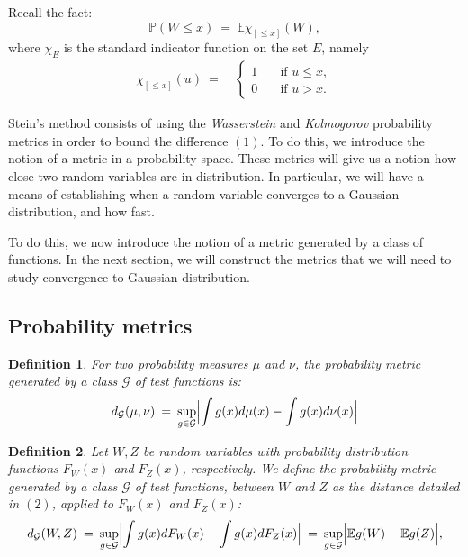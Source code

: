 \documentclass[12pt]{article}
\newcommand{\eq }{\: = \:}
\newtheorem{definition}{Definition}
\theoremstyle{nonumberplain}
\begin{document}
Recall the fact:
$$
\mathbb{P} (W\leq{x})\eq \mathbb{E}\chi_{[\le x]}(W),
$$
where $\chi_E$ is the standard indicator function on the set $E$, namely
\begin{align*}
\chi_{[\le x]}(u)\eq &\left\{
            \begin{array}{ll}
             1 \quad &\mbox{if } u\leq x,\\
             0 \quad &\mbox{if } u>x.   
            \end{array}
            \right.
\end{align*}

Stein's method consists of using the \textit{Wasserstein} and \textit{Kolmogorov} probability metrics in order to bound the difference $(1)$. To do this, we introduce the notion of a metric in a probability space. These metrics will give us a notion how close two random variables are in distribution. In particular, we will have a means of establishing when a random variable converges to a Gaussian distribution, and how fast.
 
To do this, we now introduce the notion of a metric generated by a class of functions. In the next section, we will construct the metrics that we will need to study convergence to Gaussian distribution.

\subsection{Probability metrics}

\begin{definition}
For two probability measures $\mu$ and $\nu$, the probability metric generated by a class $\mathcal{G}$ of test functions is:
\begin{equation}
d_{\mathcal{G}}(\mu, \nu)\eq \sup \limits_{g\in \mathcal{G}}  \Bigl|\int g(x)d\mu (x)-\int g(x)d\nu (x)\Bigr|
\end{equation}
\end{definition}

\begin{definition}
Let $W, Z$ be random variables with probability distribution functions $F_W(x)$ and $F_Z(x)$, respectively. We define the probability metric generated by a class $\mathcal{G}$ of test functions, between $W$ and $Z$ as the distance detailed in $(2)$, applied to $F_W(x)$ and $F_Z(x)$:
\begin{equation}
d_{\mathcal{G}}(W,Z)\eq \sup \limits_{g\in \mathcal{G}} \Bigl|\int g(x)dF_{W}(x)-\int g(x)dF_{Z}(x)\Bigr|\eq \sup \limits_{g\in \mathcal{G}} \Bigl|\mathbb{E}g(W)-\mathbb{E}g(Z)\Bigr|,
\end{equation}
\end{definition}
\end{document}
